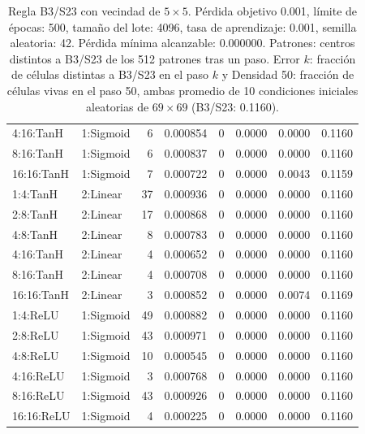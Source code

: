 \begin{table}[H]
\begin{tabular}{llrrrrrr}
		4:16:TanH & 1:Sigmoid & 6 & 0.000854 & 0 & 0.0000 & 0.0000 & 0.1160 \\
		8:16:TanH & 1:Sigmoid & 6 & 0.000837 & 0 & 0.0000 & 0.0000 & 0.1160 \\
		16:16:TanH & 1:Sigmoid & 7 & 0.000722 & 0 & 0.0000 & 0.0043 & 0.1159 \\
		\midrule
		1:4:TanH & 2:Linear & 37 & 0.000936 & 0 & 0.0000 & 0.0000 & 0.1160 \\
		2:8:TanH & 2:Linear & 17 & 0.000868 & 0 & 0.0000 & 0.0000 & 0.1160 \\
		4:8:TanH & 2:Linear & 8 & 0.000783 & 0 & 0.0000 & 0.0000 & 0.1160 \\
		4:16:TanH & 2:Linear & 4 & 0.000652 & 0 & 0.0000 & 0.0000 & 0.1160 \\
		8:16:TanH & 2:Linear & 4 & 0.000708 & 0 & 0.0000 & 0.0000 & 0.1160 \\
		16:16:TanH & 2:Linear & 3 & 0.000852 & 0 & 0.0000 & 0.0074 & 0.1169 \\
		\midrule
		1:4:ReLU & 1:Sigmoid & 49 & 0.000882 & 0 & 0.0000 & 0.0000 & 0.1160 \\
		2:8:ReLU & 1:Sigmoid & 43 & 0.000971 & 0 & 0.0000 & 0.0000 & 0.1160 \\
		4:8:ReLU & 1:Sigmoid & 10 & 0.000545 & 0 & 0.0000 & 0.0000 & 0.1160 \\
		4:16:ReLU & 1:Sigmoid & 3 & 0.000768 & 0 & 0.0000 & 0.0000 & 0.1160 \\
		8:16:ReLU & 1:Sigmoid & 43 & 0.000926 & 0 & 0.0000 & 0.0000 & 0.1160 \\
		16:16:ReLU & 1:Sigmoid & 4 & 0.000225 & 0 & 0.0000 & 0.0000 & 0.1160 \\
		\bottomrule
	\end{tabular}
	\caption{Regla B3/S23 con vecindad de $5\times5$. Pérdida objetivo 0.001, límite de épocas: 500, tamaño del lote: 4096, tasa de aprendizaje: 0.001, semilla aleatoria: 42. Pérdida mínima alcanzable: 0.000000. Patrones: centros distintos a B3/S23 de los 512 patrones tras un paso. Error $k$: fracción de células distintas a B3/S23 en el paso $k$ y Densidad 50: fracción de células vivas en el paso 50, ambas promedio de 10 condiciones iniciales aleatorias de $69\times69$ (B3/S23: 0.1160).}
	\label{tab:vecindad_5x5}
\end{table}


